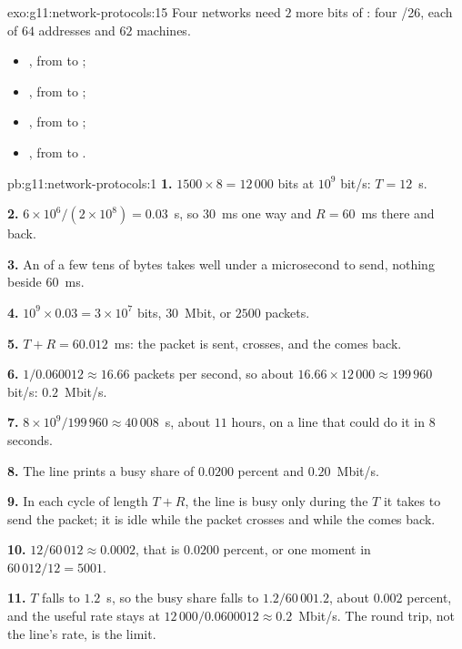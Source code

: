 \begin{solution}{exo:g11:network-protocols:15}
Four networks need $2$ more bits of : four /26, each of $64$ addresses and $62$ machines.
\begin{itemize}
  \item {}, from  to ;
  \item {}, from  to ;
  \item {}, from  to ;
  \item {}, from  to .
\end{itemize}
\end{solution}

\begin{solution}{pb:g11:network-protocols:1}
\textbf{1.} $1500 \times 8 = 12\,000$ bits at $10^9$ bit/s: $T = 12$~\textmu s.

\textbf{2.} $6 \times 10^6 / (2 \times 10^8) = 0.03$~s, so $30$~ms one way and $R = 60$~ms there and back.

\textbf{3.} An  of a few tens of bytes takes well under a microsecond to send, nothing beside $60$~ms.

\textbf{4.} $10^9 \times 0.03 = 3 \times 10^7$ bits, $30$~Mbit, or $2500$ packets.

\textbf{5.} $T + R = 60.012$~ms: the packet is sent, crosses, and the  comes back.

\textbf{6.} $1 / 0.060012 \approx 16.66$ packets per second, so about $16.66 \times 12\,000 \approx 199\,960$ bit/s:
$0.2$~Mbit/s.

\textbf{7.} $8 \times 10^9 / 199\,960 \approx 40\,008$~s, about $11$ hours, on a line that could do it in $8$ seconds.

\textbf{8.} The line  prints a busy share of $0.0200$ percent and $0.20$~Mbit/s.

\textbf{9.} In each cycle of length $T + R$, the line is busy only during the $T$ it takes to send the packet; it is
idle while the packet crosses and while the  comes back.

\textbf{10.} $12 / 60\,012 \approx 0.0002$, that is $0.0200$ percent, or one moment in $60\,012 / 12 = 5001$.

\textbf{11.} $T$ falls to $1.2$~\textmu s, so the busy share falls to $1.2 / 60\,001.2$, about $0.002$ percent, and the
useful rate stays at $12\,000 / 0.0600012 \approx 0.2$~Mbit/s. The round trip, not the line's rate, is the limit.


\end{solution}
